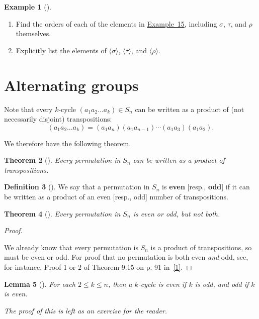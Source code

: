 \documentclass[10pt,openany,oneside]{book}
\newcommand{\terminology}[1]{\textbf{#1}}
\theoremstyle{plain}
\newtheorem{theorem}{Theorem}[section]
\newtheorem{lemma}[theorem]{Lemma}
\theoremstyle{definition}
\newtheorem{definition}[theorem]{Definition}
\theoremstyle{definition}
\theoremstyle{definition}
\newtheorem{example}[theorem]{Example}
\theoremstyle{definition}
\numberwithin{equation}{section}
\begin{document}
\begin{example}[]\label{example-56}
\leavevmode%
\begin{enumerate}
\item\hypertarget{li-339}{}Find the orders of each of the elements in \hyperref[s9ex]{Example~15}, including \(\sigma\), \(\tau\), and \(\rho\) themselves.%
\item\hypertarget{li-340}{}Explicitly list the elements of \(\langle \sigma\rangle\), \(\langle \tau\rangle\), and \(\langle \rho\rangle\).%
\end{enumerate}
%
\end{example}
\typeout{************************************************}
\typeout{************************************************}
\section[{Alternating groups}]{Alternating groups}\label{section-19}
Note that every \(k\)-cycle \((a_1a_2\ldots a_k)\in S_n\) can be written as a product of (not necessarily disjoint) transpositions:%
\begin{equation*}
(a_1a_2\ldots a_k)=(a_1a_n)(a_1a_{n-1})\cdots(a_1a_3)(a_1a_2).
\end{equation*}
%
\par
We therefore have the following theorem.%
\begin{theorem}[{}]\label{theorem-35}
Every permutation in \(S_n\) can be written as a product of transpositions.%
\end{theorem}
\begin{definition}[{}]\label{definition-49}
We say that a permutation in \(S_n\) is \terminology{even} [resp., \terminology{odd}] if it can be written as a product of an even [resp., odd] number of transpositions.%
\end{definition}
\begin{theorem}[{}]\label{theorem-36}
Every permutation in \(S_n\) is even or odd, but not both.%
\end{theorem}
\begin{proof}\hypertarget{proof-26}{}
We already know that every permutation is \(S_n\) is a product of transpositions, so must be even or odd. For proof that no permutation is both even \emph{and} odd, see, for instance, Proof 1 or 2 of Theorem 9.15 on p. 91 in~\hyperlink{F}{[1]}.%
\end{proof}
\begin{lemma}[{}]\label{evenodd}
For each \(2\leq k\leq n\), then a \(k\)-cycle is even if \(k\) is odd, and odd if \(k\) is even.%
\par
The proof of this is left as an exercise for the reader.%
\end{lemma}
\end{document}
